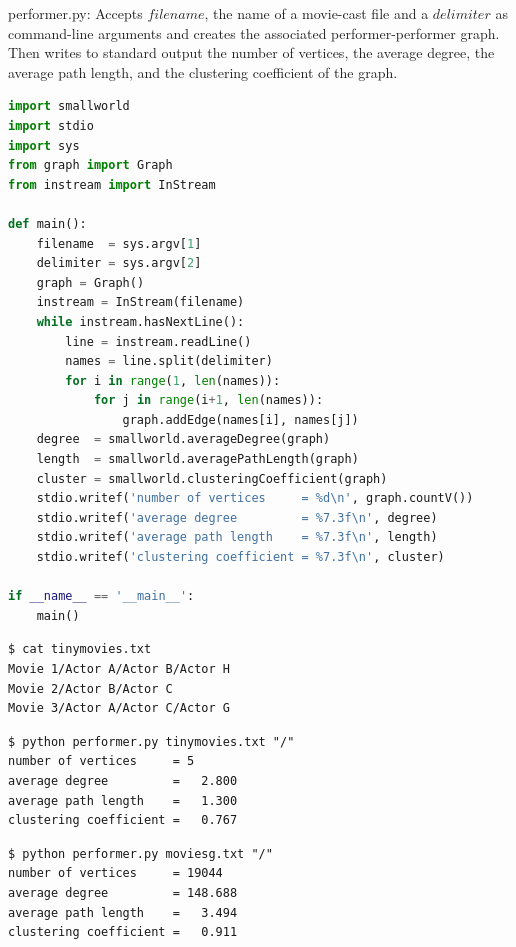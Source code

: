 \documentclass[8pt,a4paper,compress,handout]{beamer}
\begin{document}
\begin{frame}[fragile]
\begin{framed}
\tiny performer.py: Accepts $filename$, the name of a movie-cast file and a $delimiter$ as command-line arguments and creates the associated performer-performer graph. Then writes to standard output the number of vertices, the average degree, the average path length, and the clustering coefficient of the graph.
\end{framed}

\begin{lstlisting}[language=Python]
import smallworld
import stdio
import sys
from graph import Graph
from instream import InStream

def main():
    filename  = sys.argv[1]
    delimiter = sys.argv[2]
    graph = Graph()
    instream = InStream(filename)
    while instream.hasNextLine():
        line = instream.readLine()
        names = line.split(delimiter)
        for i in range(1, len(names)):
            for j in range(i+1, len(names)):
                graph.addEdge(names[i], names[j])
    degree  = smallworld.averageDegree(graph)
    length  = smallworld.averagePathLength(graph)
    cluster = smallworld.clusteringCoefficient(graph)
    stdio.writef('number of vertices     = %d\n', graph.countV())
    stdio.writef('average degree         = %7.3f\n', degree)
    stdio.writef('average path length    = %7.3f\n', length)
    stdio.writef('clustering coefficient = %7.3f\n', cluster)

if __name__ == '__main__':
    main()
\end{lstlisting}
\end{frame}

\begin{frame}[fragile]
\begin{lstlisting}[language={}]
$ cat tinymovies.txt
Movie 1/Actor A/Actor B/Actor H
Movie 2/Actor B/Actor C
Movie 3/Actor A/Actor C/Actor G
\end{lstlisting}

\begin{lstlisting}[language={}]
$ python performer.py tinymovies.txt "/"
number of vertices     = 5
average degree         =   2.800
average path length    =   1.300
clustering coefficient =   0.767
\end{lstlisting}

\begin{lstlisting}[language={}]
$ python performer.py moviesg.txt "/"
number of vertices     = 19044
average degree         = 148.688
average path length    =   3.494
clustering coefficient =   0.911
\end{lstlisting}
\end{frame}
\end{document}

